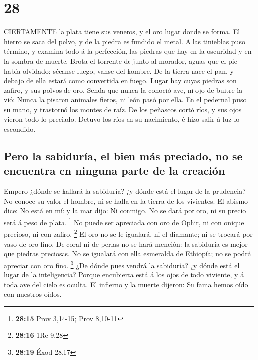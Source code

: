 \hypertarget{section-27}{%
\section{28}\label{section-27}}

 CIERTAMENTE la plata tiene sus veneros, y el oro lugar
donde se forma.  El hierro se saca del polvo, y de la piedra
es fundido el metal.  A las tinieblas puso término, y
examina todo á la perfección, las piedras que hay en la oscuridad y en
la sombra de muerte.  Brota el torrente de junto al morador,
aguas que el pie había olvidado: sécanse luego, vanse del hombre.
 De la tierra nace el pan, y debajo de ella estará como
convertida en fuego.  Lugar hay cuyas piedras son zafiro, y
sus polvos de oro.  Senda que nunca la conoció ave, ni ojo
de buitre la vió:  Nunca la pisaron animales fieros, ni león
pasó por ella.  En el pedernal puso su mano, y trastornó los
montes de raíz.  De los peñascos cortó ríos, y sus ojos
vieron todo lo preciado.  Detuvo los ríos en su nacimiento,
é hizo salir á luz lo escondido.

\hypertarget{pero-la-sabiduruxeda-el-bien-muxe1s-preciado-no-se-encuentra-en-ninguna-parte-de-la-creaciuxf3n}{%
\subsection{Pero la sabiduría, el bien más preciado, no se encuentra en
ninguna parte de la
creación}\label{pero-la-sabiduruxeda-el-bien-muxe1s-preciado-no-se-encuentra-en-ninguna-parte-de-la-creaciuxf3n}}

 Empero ¿dónde se hallará la sabiduría? ¿y dónde está el
lugar de la prudencia?  No conoce su valor el hombre, ni se
halla en la tierra de los vivientes.  El abismo dice: No
está en mí: y la mar dijo: Ni conmigo.  No se dará por oro,
ni su precio será á peso de plata. \footnote{\textbf{28:15} Prov
  3,14-15; Prov 8,10-11}  No puede ser apreciada con oro de
Ophir, ni con onique precioso, ni con zafiro. \footnote{\textbf{28:16}
  1Re 9,28}  El oro no se le igualará, ni el diamante; ni
se trocará por vaso de oro fino.  De coral ni de perlas no
se hará mención: la sabiduría es mejor que piedras preciosas.
 No se igualará con ella esmeralda de Ethiopía; no se podrá
apreciar con oro fino. \footnote{\textbf{28:19} Éxod 28,17}
 ¿De dónde pues vendrá la sabiduría? ¿y dónde está el lugar
de la inteligencia?  Porque encubierta está á los ojos de
todo viviente, y á toda ave del cielo es oculta.  El
infierno y la muerte dijeron: Su fama hemos oído con nuestros oídos.

